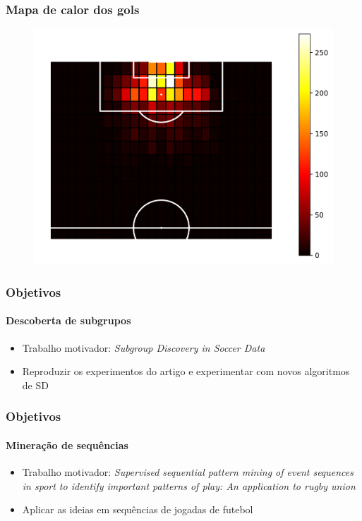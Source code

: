 \documentclass{beamer}
\begin{document}
\begin{frame}
    \frametitle{Mapa de calor dos gols}
\begin{figure}[H]
\centering
\includegraphics[width=\linewidth]{../report/images/goal_position_heatmap.png}
\end{figure}
\end{frame}

\begin{frame}
\frametitle{Objetivos}
\framesubtitle{Descoberta de subgrupos}
\begin{itemize}
    \item Trabalho motivador: \textit{Subgroup Discovery in Soccer Data}
    \item Reproduzir os experimentos do artigo e experimentar com novos algoritmos de SD
\end{itemize}
\end{frame}

\begin{frame}
\frametitle{Objetivos}
\framesubtitle{Mineração de sequências}
\begin{itemize}
    \item Trabalho motivador: \textit{Supervised sequential pattern mining of event sequences in sport to identify important patterns of play: An application to rugby union}
    \item Aplicar as ideias em sequências de jogadas de futebol
\end{itemize}
\end{frame}
\end{document}
